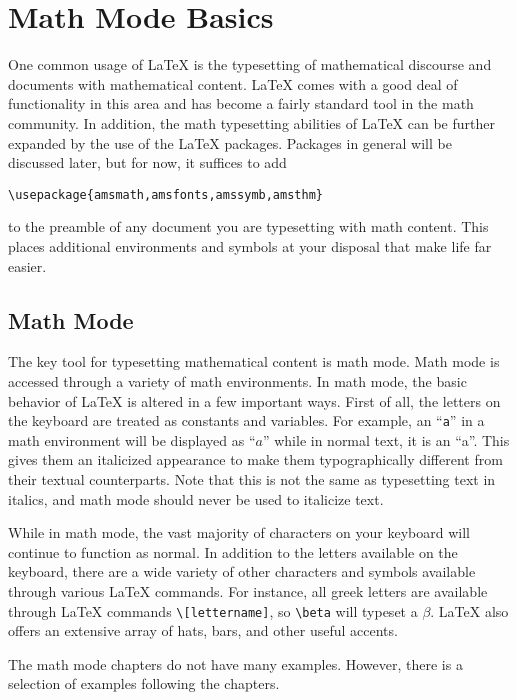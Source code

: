 \chapter{Math Mode Basics}
\label{cha:math-mode-basics}

One common usage of \LaTeX{} is the typesetting of mathematical
discourse and documents with mathematical content.  \LaTeX{} comes
with a good deal of functionality in this area and has become a fairly
standard tool in the math community.  In addition, the math
typesetting abilities of \LaTeX{} can be further expanded by the use
of the \AmS{-}\LaTeX{} packages.
Packages in general will be discussed later, but for now, it suffices
to add
\begin{verbatim}
\usepackage{amsmath,amsfonts,amssymb,amsthm}
\end{verbatim}
to the preamble of any document you are typesetting with math content.
This places additional environments and symbols at your disposal that
make life far easier.

\section{Math Mode}
\label{sec:math-mode}

The key tool for typesetting mathematical content is math mode.  Math
mode is accessed through a variety of math environments.  In math
mode, the basic behavior of \LaTeX{} is altered in a few important
ways.  First of all, the letters on the keyboard are treated as
constants and variables.
For example, an ``\verb=a='' in a math environment will be
displayed as ``\(a\)'' while in normal text, it is an ``a''.
This gives them an italicized
appearance to make them typographically different from their textual
counterparts.  Note that this is not the same as typesetting text in
italics, and math mode should never be used to italicize text.

While in math mode, the vast majority of characters on your keyboard
will continue to function as normal.  In addition to the letters
available on the keyboard, there are a wide variety of other
characters and symbols available through various \LaTeX{} commands.
For instance, all greek letters are available through \LaTeX{}
commands \verb!\[lettername]!, so \verb!\beta! will typeset a
\(\beta\).
\LaTeX{} also offers an extensive array of hats, bars, and other
useful accents.

The math mode chapters do not have many examples.  However, there is a
selection of examples following the chapters.

